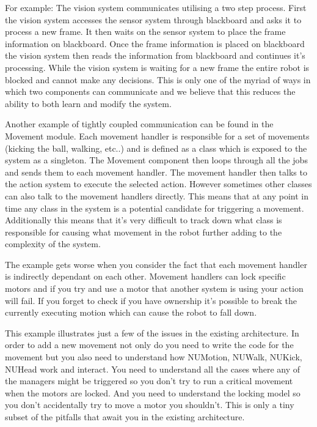 \documentclass[english,12pt]{scrartcl}
\begin{document}
            For example: The vision system communicates utilising a two step process. 
            First the vision system accesses the sensor system through blackboard and asks it to process a new frame.
            It then waits on the sensor system to place the frame information on blackboard. 
            Once the frame information is placed on blackboard the vision system then reads the information 
            from blackboard and continues it's processing. 
            While the vision system is waiting for a new frame the entire robot is blocked and cannot make any decisions.
            This is only one of the myriad of ways in which two components can communicate and we believe that 
            this reduces the ability to both learn and modify the system.

            Another example of tightly coupled communication can be found in the Movement module.
            Each movement handler is responsible for a set of movements (kicking the ball, walking,
            etc..) and is defined as a class which is exposed to the system as a singleton. The
            Movement component then loops through all the jobs and sends them to each movement
            handler. The movement handler then talks to the action system to execute the selected
            action. However sometimes other classes can also talk to the movement handlers directly. 
            This means that at any point in time any class in the system is a potential candidate
            for triggering a movement. Additionally this means that it's very difficult to track
            down what class is responsible for causing what movement in the robot further adding to
            the complexity of the system.

            The example gets worse when you consider the fact that each movement handler is
            indirectly dependant on each other. Movement handlers can lock specific motors and if
            you try and use a motor that another system is using your action will fail. If you
            forget to check if you have ownership it's possible to break the currently executing
            motion which can cause the robot to fall down.
            
            This example illustrates just a few of the issues in the existing architecture.
            In order to add a new movement not only do you need to write the code for the movement
            but you also need to understand how NUMotion, NUWalk, NUKick, NUHead work and interact.
            You need to understand all the cases where any of the managers might be triggered so you
            don't try to run a critical movement when the motors are locked. And you need to
            understand the locking model so you don't accidentally try to move a motor you
            shouldn't. This is only a tiny subset of the pitfalls that await you in the existing
            architecture.
\end{document}
